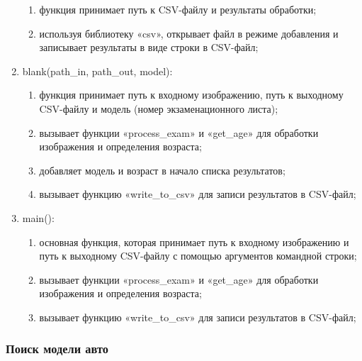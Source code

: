 \begin{enumerate}
        \begin{enumerate}
            \item функция принимает путь к CSV-файлу и результаты обработки;
            \item используя библиотеку «csv», открывает файл в режиме добавления и записывает результаты в виде строки в CSV-файл;
        \end{enumerate}
    \item blank(path\_in, path\_out, model):
        \begin{enumerate}
            \item функция принимает путь к входному изображению, путь к выходному CSV-файлу и модель (номер экзаменационного листа);
            \item вызывает функции «process\_exam» и «get\_age» для обработки изображения и определения возраста;
            \item добавляет модель и возраст в начало списка результатов;
            \item вызывает функцию «write\_to\_csv» для записи результатов в CSV-файл;
        \end{enumerate}
    \item main():
        \begin{enumerate}
            \item основная функция, которая принимает путь к входному изображению и путь к выходному CSV-файлу с помощью аргументов командной строки;
            \item вызывает функции «process\_exam» и «get\_age» для обработки изображения и определения возраста;
            \item вызывает функцию «write\_to\_csv» для записи результатов в CSV-файл;
        \end{enumerate}
\end{enumerate}

\subsubsection{Поиск модели авто}

